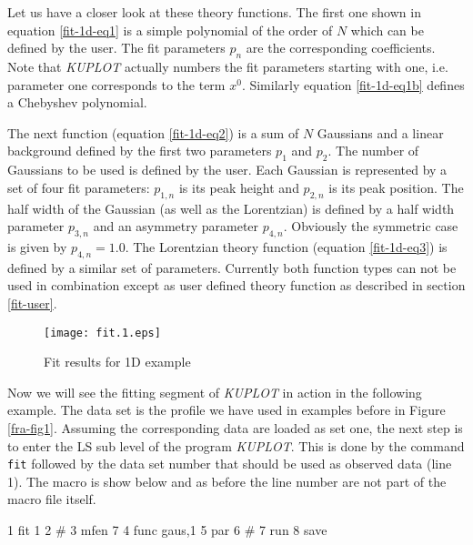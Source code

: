 Let us have a closer look at these theory functions.  The first one
shown in equation \ref{fit-1d-eq1} is a simple polynomial of the
order of $N$ which can be defined by the user.  The fit parameters
$p_{n}$ are the corresponding coefficients.  Note that {\it KUPLOT}
actually numbers the fit parameters starting with one, i.e.
parameter one corresponds to the term $x^{0}$. Similarly equation
\ref{fit-1d-eq1b} defines a Chebyshev polynomial.
\par

The next function (equation \ref{fit-1d-eq2}) is a sum of $N$ Gaussians and
a linear background defined by the first two parameters $p_{1}$ and
$p_{2}$.  The number of Gaussians to be used is defined by the user.  Each
Gaussian is represented by a set of four fit parameters: $p_{1,n}$ is its
peak height and $p_{2,n}$ is its peak position.  The half width of the
Gaussian (as well as the Lorentzian) is defined by a half width parameter
$p_{3,n}$ and an asymmetry parameter $p_{4,n}$.  Obviously the symmetric
case is given by $p_{4,n} = 1.0$.  The Lorentzian theory function (equation
\ref{fit-1d-eq3}) is defined by a similar set of parameters.  Currently
both function types can not be used in combination except as user defined
theory function as described in section \ref{fit-user}.  \par


\begin{figure}[!tbhp]
   \centering
   \texttt{[image: fit.1.eps]}
   \caption{Fit results for 1D example}
   \label{fit-fig1}
\end{figure}

Now we will see the fitting segment of {\it KUPLOT} in action in the
following example.  The data set is the profile we have used in
examples before in Figure \ref{fra-fig1}. Assuming the corresponding
data are loaded as set one, the next step is to enter the LS
sub level of the program {\it KUPLOT}.  This is done by the command
{\tt fit} followed by the data set number that should be used as
observed data (line 1).  The macro is show below and as before the
line number are not part of the macro file itself.

\begin{MacVerbatim}
     1  fit 1
     2  #
     3  mfen 7
     4  func gaus,1
     5  par
     6  #
     7  run
     8  save
\end{MacVerbatim}

